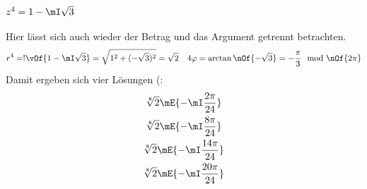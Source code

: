 \documentclass[11pt,a4paper]{scrartcl}
\begin{document}
	\subsection{$z^4 = 1 - \mI \sqrt{3}$}
	Hier lässt sich auch wieder der Betrag und das Argument getrennt betrachten.
	\begin{equation}
		r^4 =! \vOf{1-\mI\sqrt{3}} = \sqrt{1^2 + (-\sqrt{3})^2} = \sqrt{2} \quad 4\varphi = \arctan\nOf{-\sqrt{3}} = -\frac{\pi}{3} \mod\nOf{2\pi}
	\end{equation}
	Damit ergeben sich vier Lösungen (:
	\begin{gather}
		\sqrt[8]{2} \mE{-\mI\frac{2\pi}{24}} \\
		\sqrt[8]{2} \mE{-\mI\frac{8\pi}{24}} \\
		\sqrt[8]{2} \mE{-\mI\frac{14\pi}{24}} \\
		\sqrt[8]{2} \mE{-\mI\frac{20\pi}{24}} \\
	\end{gather}
\end{document}

